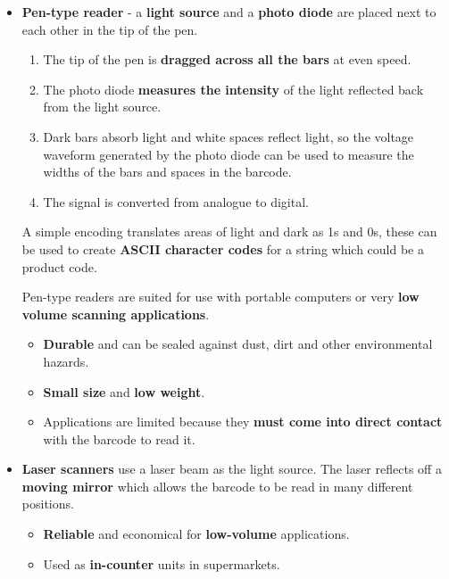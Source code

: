 \begin{itemize}
    \item \textbf{Pen-type reader} - a \textbf{light source} and a \textbf{photo diode} are placed next to each other in the tip of the pen.
        
        \begin{enumerate}
            \item The tip of the pen is \textbf{dragged across all the bars} at even speed.
            \item The photo diode \textbf{measures the intensity} of the light reflected back from the light source.
            \item Dark bars absorb light and white spaces reflect light, so the voltage waveform generated by the photo diode can be used to measure the widths of the bars and spaces in the barcode.
            \item The signal is converted from analogue to digital.
        \end{enumerate}

        A simple encoding translates areas of light and dark as 1s and 0s, these can be used to create \textbf{ASCII character codes} for a string which could be a product code.

        Pen-type readers are suited for use with portable computers or very \textbf{low volume scanning applications}.
        \begin{itemize}
            \item \textbf{Durable} and can be sealed against dust, dirt and other environmental hazards.
            \item \textbf{Small size} and \textbf{low weight}.
            \item Applications are limited because they \textbf{must come into direct contact} with the barcode to read it.
        \end{itemize}

    \item \textbf{Laser scanners} use a laser beam as the light source. The laser reflects off a \textbf{moving mirror} which allows the barcode to be read in many different positions.
        \begin{itemize}
            \item \textbf{Reliable} and economical for \textbf{low-volume} applications.
            \item Used as \textbf{in-counter} units in supermarkets.
        \end{itemize}


\end{itemize}
